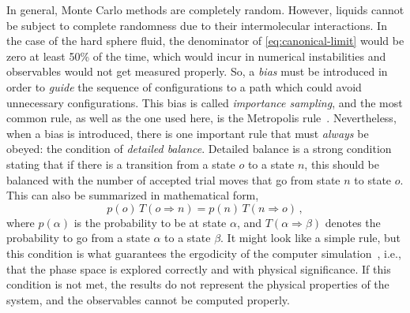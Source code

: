 In general, Monte Carlo methods are completely random. However, liquids cannot be
subject to complete randomness due to their intermolecular interactions. In the case
of the hard sphere fluid, the denominator of \autoref{eq:canonical-limit} would be zero
at least 50\% of the time, which would incur in numerical instabilities and observables
would not get measured properly. So, a \emph{bias} must be introduced in order to
\emph{guide} the sequence of configurations to a path which could avoid unnecessary
configurations. This bias is called \emph{importance sampling}, and the most common rule,
as well as the one used here, is the Metropolis rule~\cite{landauGuideMonteCarlo2021}.
Nevertheless, when a bias is introduced, there is one important rule that must
\emph{always} be obeyed: the condition of \emph{detailed balance}. Detailed balance
is a strong condition stating that if there is a transition from a state $o$ to a
state $n$, this should be balanced with the number of accepted trial moves that go
from state $n$ to state $o$. This can also be summarized in mathematical form,
\begin{equation}
    p(o) \, T(o \Longrightarrow n) = p(n) \, T(n \Longrightarrow o) \, ,
    \label{eq:detailed-balance}
\end{equation}
where $p(\alpha)$ is the probability to be at state $\alpha$, and 
$T(\alpha \Longrightarrow \beta)$ denotes the probability to go from a state 
$\alpha$ to a state $\beta$. It might look like a simple rule, but this condition
is what guarantees the ergodicity of the computer
simulation~\cite{landauGuideMonteCarlo2021}, i.e., that the phase space is explored
correctly and with physical significance. If this condition is not met, the results
do not represent the physical properties of the system, and the observables cannot
be computed properly.

